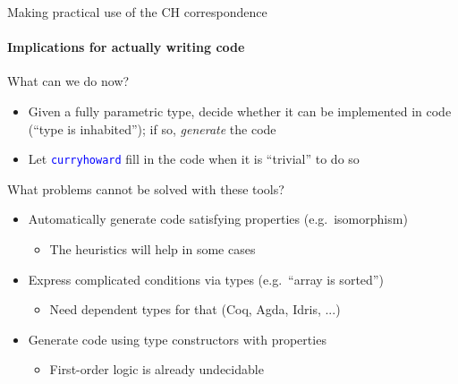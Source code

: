 \documentclass[english]{beamer}
\begin{document}
\begin{frame}{Making practical use of the CH correspondence}


\framesubtitle{Implications for actually writing code}

What can we do now?
\begin{itemize}
\item Given a fully parametric type, decide whether it can be implemented
in code (``type is inhabited''); if so, \emph{generate} the code
\item Let \texttt{\textcolor{blue}{\footnotesize{}curryhoward}} fill in
the code when it is ``trivial'' to do so
\end{itemize}
What problems cannot be solved with these tools?
\begin{itemize}
\item Automatically generate code satisfying properties (e.g.\ isomorphism)
\begin{itemize}
\item The heuristics will help in some cases
\end{itemize}
\item Express complicated conditions via types (e.g.\ ``array is sorted'')
\begin{itemize}
\item Need dependent types for that (Coq, Agda, Idris, ...)
\end{itemize}
\item Generate code using type constructors with properties
\begin{itemize}
\item First-order logic is already undecidable
\end{itemize}
\end{itemize}
\end{frame}
\end{document}
